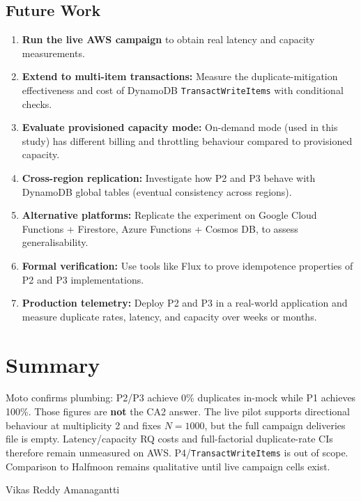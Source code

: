 \subsection{Future Work}

\begin{enumerate}
    \item \textbf{Run the live AWS campaign} to obtain real latency and capacity measurements.
    \item \textbf{Extend to multi-item transactions:} Measure the duplicate-mitigation effectiveness and cost of DynamoDB \texttt{TransactWriteItems} with conditional checks.
    \item \textbf{Evaluate provisioned capacity mode:} On-demand mode (used in this study) has different billing and throttling behaviour compared to provisioned capacity.
    \item \textbf{Cross-region replication:} Investigate how P2 and P3 behave with DynamoDB global tables (eventual consistency across regions).
    \item \textbf{Alternative platforms:} Replicate the experiment on Google Cloud Functions + Firestore, Azure Functions + Cosmos DB, to assess generalisability.
    \item \textbf{Formal verification:} Use tools like Flux \citep{Ding2023Flux} to prove idempotence properties of P2 and P3 implementations.
    \item \textbf{Production telemetry:} Deploy P2 and P3 in a real-world application and measure duplicate rates, latency, and capacity over weeks or months.
\end{enumerate}

\section{Summary}

Moto confirms plumbing: P2/P3 achieve 0\% duplicates in-mock while P1 achieves 100\%. Those figures are \textbf{not} the CA2 answer. The live pilot supports directional behaviour at multiplicity 2 and fixes $N=1000$, but the full campaign deliveries file is empty. Latency/capacity RQ costs and full-factorial duplicate-rate CIs therefore remain unmeasured on AWS. P4/\texttt{TransactWriteItems} is out of scope. Comparison to Halfmoon remains qualitative until live campaign cells exist.

Vikas Reddy Amanagantti

